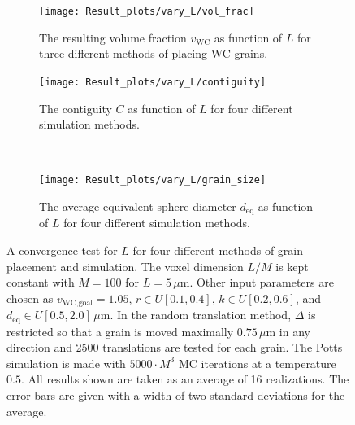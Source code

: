 \documentclass[10pt,a4paper]{article}
\begin{document}
\begin{figure}
	\begin{center}
		\begin{subfigure}[t]{.49\columnwidth}
			\centering
			\texttt{[image: Result\_plots/vary\_L/vol\_frac]}
			\caption{The resulting volume fraction $v_\text{WC}$ as function of $L$ for three different methods of placing WC grains.}
			\label{fig:vary_L_vol_frac}
		\end{subfigure}
		\begin{subfigure}[t]{.49\columnwidth}
			\centering
			\texttt{[image: Result\_plots/vary\_L/contiguity]}
			\caption{The contiguity $C$ as function of $L$ for four different simulation methods.}
			\label{fig:vary_L_contiguity}
		\end{subfigure}
		\\
		\begin{subfigure}[t]{.49\columnwidth}
			\centering
			\texttt{[image: Result\_plots/vary\_L/grain\_size]}
			\caption{The average equivalent sphere diameter $d_\text{eq}$ as function of $L$ for four different simulation methods.}
			\label{fig:vary_L_grain_size}
		\end{subfigure}
		\caption{A convergence test for $L$ for four different methods of grain placement and simulation. The voxel dimension $L/M$ is kept constant with $M=100$ for $L=5 \, \mu\text{m}$. Other input parameters are chosen as $v_\text{WC,goal} = 1.05$, $r \in U[0.1, 0.4]$, $k \in U[0.2, 0.6]$, and $d_\text{eq} \in U[0.5, 2.0] \, \mu\text{m}$. In the random translation method, $\Delta$ is restricted so that a grain is moved maximally $0.75 \, \mu \text{m}$ in any direction and 2500 translations are tested for each grain. The Potts simulation is made with $5000 \cdot M^3$ MC iterations at a temperature $0.5$. All results shown are taken as an average of 16 realizations. The error bars are given with a width of two standard deviations for the average.}
		\label{fig:vary_L}
	\end{center}
\end{figure}
\end{document}
